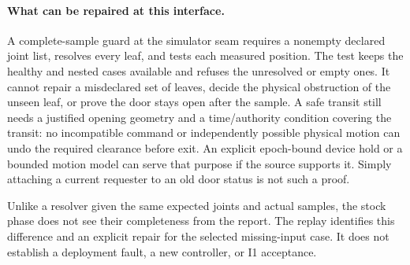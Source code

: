 \documentclass[11pt]{article}
\begin{document}
\paragraph{What can be repaired at this interface.}
A complete-sample guard at the simulator seam requires a nonempty
declared joint list, resolves every leaf, and tests each measured
position. The test keeps the healthy and nested cases available
and refuses the unresolved or empty ones. It cannot repair a
misdeclared set of leaves, decide the physical obstruction of
the unseen leaf, or prove the door stays open after the sample.
A safe transit still needs a justified opening geometry and a
time/authority condition covering the transit: no incompatible
command or independently possible physical motion can undo the
required clearance before exit. An explicit epoch-bound device
hold or a bounded motion model can serve that purpose if the
source supports it. Simply attaching a current requester to an
old door status is not such a proof.

Unlike a resolver given the same expected joints and actual
samples, the stock phase does not see their completeness from
the report. The replay identifies this difference and an explicit
repair for the selected missing-input case. It does not
establish a deployment fault, a new controller, or I1 acceptance.
\end{document}
